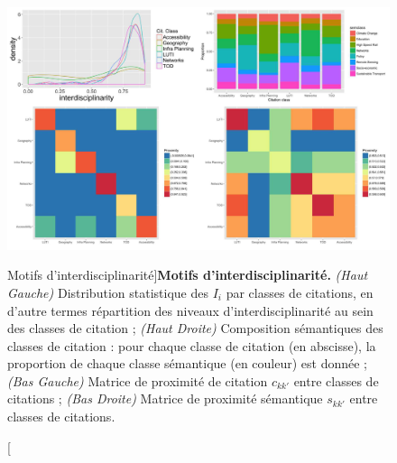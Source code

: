\begin{figure}
\includegraphics[width=\linewidth]{Figures/Final/2-2-2-fig-quantepistemo-interdisc.jpg}
\caption[][Motifs d'interdisciplinarité]{\label{fig:quantepistemo:interdisc}}{\textbf{Motifs d'interdisciplinarité.} \textit{(Haut Gauche)} Distribution statistique des $I_i$ par classes de citations, en d'autre termes répartition des niveaux d'interdisciplinarité au sein des classes de citation ; \textit{(Haut Droite)} Composition sémantiques des classes de citation : pour chaque classe de citation (en abscisse), la proportion de chaque classe sémantique (en couleur) est donnée ; \textit{(Bas Gauche)} Matrice de proximité de citation $c_{kk'}$ entre classes de citations ; \textit{(Bas Droite)} Matrice de proximité sémantique $s_{kk'}$ entre classes de citations.\label{fig:quantepistemo:interdisc}}
\end{figure}





